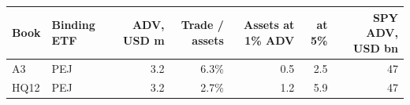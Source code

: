 \begin{tabular}{llrrrrr}
\toprule
Book & Binding ETF & ADV, USD m & Trade / assets & Assets at 1\% ADV & at 5\% & SPY ADV, USD bn \\
\midrule
A3 & PEJ & 3.2 & 6.3\% & 0.5 & 2.5 & 47 \\
HQ12 & PEJ & 3.2 & 2.7\% & 1.2 & 5.9 & 47 \\
\bottomrule
\end{tabular}
